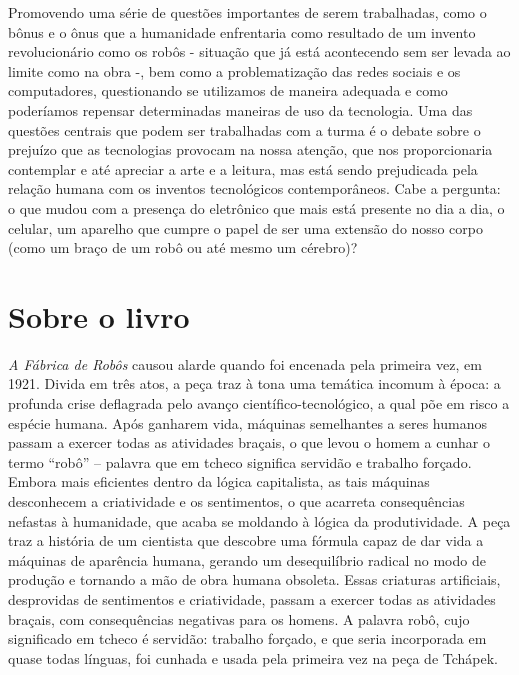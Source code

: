 \documentclass[11pt]{extarticle}
\begin{document}
Promovendo uma série de questões importantes de serem trabalhadas, como o bônus e o ônus que a humanidade enfrentaria como resultado de um invento revolucionário como os robôs - situação que já está acontecendo sem ser levada ao limite como na obra -, bem como a problematização das redes sociais e os computadores, questionando se utilizamos de maneira adequada e como poderíamos repensar determinadas maneiras de uso da tecnologia. Uma das questões centrais que podem ser trabalhadas com a turma é o debate sobre o prejuízo que as tecnologias provocam na nossa atenção, que nos proporcionaria contemplar e até apreciar a arte e a leitura, mas está sendo prejudicada pela relação humana com os inventos tecnológicos contemporâneos. Cabe a pergunta: o que mudou com a presença do eletrônico que mais está presente no dia a dia, o celular, um aparelho que cumpre o papel de ser uma extensão do nosso corpo (como um braço de um robô ou até mesmo um cérebro)? 


\section{Sobre o livro}

\textit{A Fábrica de Robôs} causou alarde quando foi encenada pela primeira vez, em 1921. Divida em três atos, a peça traz à tona uma temática incomum à época: a profunda crise deflagrada pelo avanço científico-tecnológico, a qual põe em risco a espécie humana. Após ganharem vida, máquinas semelhantes a seres humanos passam a exercer todas as atividades braçais, o que levou o homem a cunhar o termo “robô” – palavra que em tcheco significa servidão e trabalho forçado. Embora mais eficientes dentro da lógica capitalista, as tais máquinas desconhecem a criatividade e os sentimentos, o que acarreta consequências nefastas à humanidade, que acaba se moldando à lógica da produtividade. A peça traz a história de um cientista que descobre uma fórmula capaz de dar vida a máquinas de aparência humana, gerando um desequilíbrio radical no modo de produção e tornando a mão de obra humana obsoleta. Essas criaturas artificiais, desprovidas de sentimentos e criatividade, passam a exercer todas as atividades braçais, com consequências negativas para os homens. A palavra robô, cujo significado em tcheco é servidão: trabalho forçado, e que seria incorporada em quase todas línguas, foi cunhada e usada pela primeira vez na peça de Tchápek.
\end{document}
